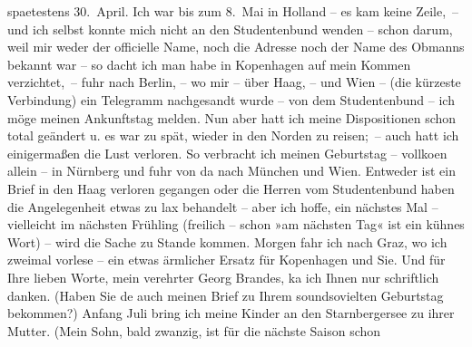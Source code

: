 \begin{ledgroupsized}[t]{13cm}
                    spaetestens 30. April. Ich war bis zum 8. Mai in Holland – es kam keine Zeile, – und ich
                    selbst konnte mich nicht an den Studentenbund wenden – schon darum, weil mir
                    weder der officielle Name, noch die Adresse noch der Name des Obmanns {\pb}bekannt war – so dacht ich man habe in Kopenhagen auf mein Kommen verzichtet, – fuhr
               nach Berlin, – wo mir – über Haag, – und Wien – (die
                    kürzeste Verbindung) ein Telegramm nachgesandt wurde – von dem Studentenbund –
                    ich möge meinen Ankunftstag melden. Nun aber hatt ich meine Dispositionen schon
                    total geändert u. es war zu spät, wieder in den Norden zu reisen; – auch hatt
                    ich einigermaßen die Lust verloren. So verbracht ich meinen Geburtstag –
                        vollko{\geminationm}en allein – in Nürnberg und fuhr von da nach München und Wien. Entweder
               ist ein Brief in den Haag verloren gegangen
                    oder die Herren vom Studentenbund haben die Angelegenheit etwas zu lax behandelt
                    – aber ich hoffe, ein nächstes Mal – vielleicht im nächsten Frühling (freilich –
                    schon »am nächsten Tag« ist ein kühnes Wort) – wird die Sache zu Stande kommen.
                        {\pb}Morgen fahr ich nach Graz, wo ich zweimal vorlese – ein etwas ärmlicher Ersatz
                    für Kopenhagen und Sie.\pend
           \pstart
           Und für Ihre lieben Worte, mein verehrter Georg Brandes, ka{\geminationn} ich Ihnen nur schriftlich danken. (Haben Sie
                        de{\geminationn} auch meinen Brief zu Ihrem soundsovielten
                    Geburtstag bekommen?)\pend
           \pstart
           Anfang Juli bring ich meine Kinder an den Starnbergersee zu ihrer Mutter. (Mein Sohn, bald zwanzig, ist für die nächste Saison schon

\end{ledgroupsized}
